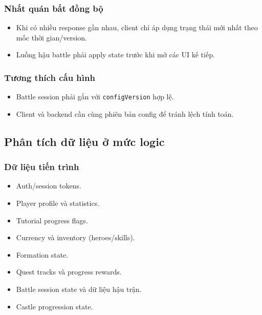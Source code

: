 \subsubsection{Nhất quán bất đồng bộ}
\label{subsec:analysis_rules_consistency}
\begin{itemize}
    \item Khi có nhiều response gần nhau, client chỉ áp dụng trạng thái mới nhất theo mốc thời gian/version.
    \item Luồng hậu battle phải apply state trước khi mở các UI kế tiếp.
\end{itemize}

\subsubsection{Tương thích cấu hình}
\label{subsec:analysis_rules_config}
\begin{itemize}
    \item Battle session phải gắn với \texttt{configVersion} hợp lệ.
    \item Client và backend cần cùng phiên bản config để tránh lệch tính toán.
\end{itemize}

\subsection{Phân tích dữ liệu ở mức logic}
\label{subsec:analysis_data}

\subsubsection{Dữ liệu tiến trình}
\label{subsec:analysis_data_types}
\begin{itemize}
    \item Auth/session tokens.
    \item Player profile và statistics.
    \item Tutorial progress flags.
    \item Currency và inventory (heroes/\allowbreak skills).
    \item Formation state.
    \item Quest tracks và progress rewards.
    \item Battle session state và dữ liệu hậu trận.
    \item Castle progression state.
\end{itemize}

